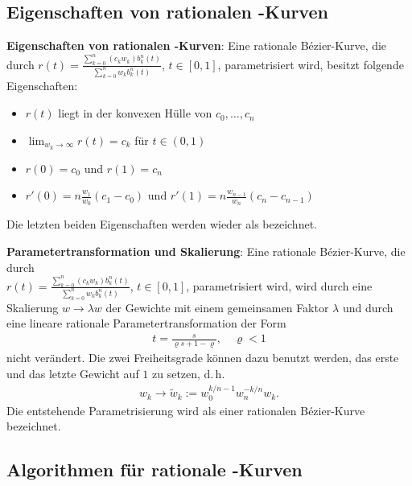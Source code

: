 \subsection{%
    Eigenschaften von rationalen -Kurven%
}

\textbf{Eigenschaften von rationalen -Kurven}:
Eine rationale Bézier-Kurve, die durch
$r(t) = \frac{\sum_{k=0}^n (c_k w_k) b_k^n(t)}{\sum_{k=0}^n w_k b_k^n(t)}$, $t \in [0, 1]$,
parametrisiert wird, besitzt folgende Eigenschaften:
\begin{itemize}
    \item
    $r(t)$ liegt in der konvexen Hülle von $c_0, \dotsc, c_n$

    \item
    $\lim_{w_k \to \infty} r(t) = c_k$ für $t \in (0, 1)$

    \item
    $r(0) = c_0$ und $r(1) = c_n$

    \item
    $r'(0) = n \frac{w_1}{w_0} (c_1 - c_0)$ und $r'(1) = n \frac{w_{n-1}}{w_n} (c_n - c_{n-1})$
\end{itemize}
Die letzten beiden Eigenschaften werden wieder als  bezeichnet.

\linie
\pagebreak

\textbf{Parametertransformation und Skalierung}:
Eine rationale Bézier-Kurve, die durch\\
$r(t) = \frac{\sum_{k=0}^n (c_k w_k) b_k^n(t)}{\sum_{k=0}^n w_k b_k^n(t)}$, $t \in [0, 1]$,
parametrisiert wird, wird durch eine Skalierung $w \rightarrow \lambda w$
der Gewichte mit einem gemeinsamen Faktor $\lambda$ und durch eine lineare rationale
Parametertransformation der Form
\begin{align*}
    t = \frac{s}{\varrho s + 1 - \varrho},\quad \varrho < 1
\end{align*}
nicht verändert.
Die zwei Freiheitsgrade können dazu benutzt werden, das erste und das letzte Gewicht auf $1$
zu setzen, d.\,h.
\begin{align*}
    w_k \rightarrow \widetilde{w}_k := w_0^{k/n-1} w_n^{-k/n} w_k.
\end{align*}
Die entstehende Parametrisierung wird als  einer rationalen
Bézier-Kurve bezeichnet.

\subsection{%
    Algorithmen für rationale -Kurven%
}


